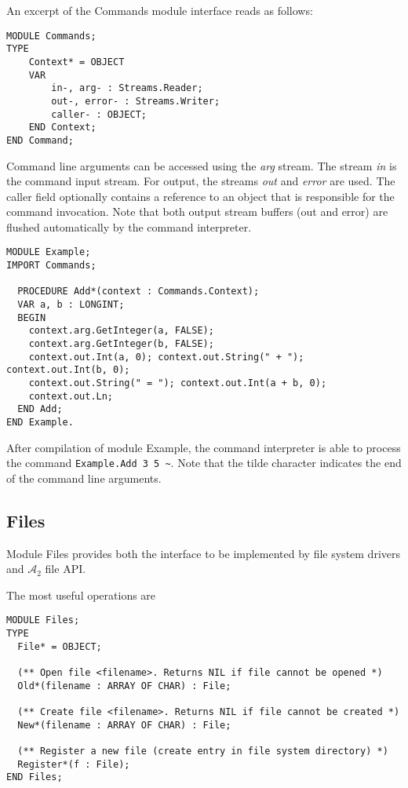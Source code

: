 \documentclass[a4paper,11pt]{article}
\newcommand{\AZ}{\ensuremath{\mathcal{A}_{2}}\xspace}
\begin{document}
An excerpt of the Commands module interface reads as follows:
\begin{lstlisting}[language=Oberon,frame=none,caption={Command Context}]
MODULE Commands;
TYPE
    Context* = OBJECT
    VAR
        in-, arg- : Streams.Reader;
        out-, error- : Streams.Writer;
        caller- : OBJECT;
    END Context;
END Command;
\end{lstlisting}

Command line arguments can be accessed using the \emph{arg} stream. The stream \emph{in} is the command input stream. For output, the streams \emph{out} and \emph{error} are used.
The caller field optionally contains a reference to an object that is responsible for the command invocation. Note that both output stream buffers (out and error) are flushed automatically by the command interpreter.

\begin{lstlisting}[language=Oberon,frame=none,caption={Command Example}]
MODULE Example;
IMPORT Commands;

  PROCEDURE Add*(context : Commands.Context);
  VAR a, b : LONGINT;
  BEGIN
    context.arg.GetInteger(a, FALSE);
    context.arg.GetInteger(b, FALSE);
    context.out.Int(a, 0); context.out.String(" + "); context.out.Int(b, 0);
    context.out.String(" = "); context.out.Int(a + b, 0);
    context.out.Ln;
  END Add;
END Example.
\end{lstlisting}

After compilation of module Example, the command interpreter is able to process the command
\verb+Example.Add 3 5 ~+.
Note that the tilde character indicates the end of the command line arguments.

\subsection{Files}
Module Files provides both the interface to be implemented by file system drivers and \AZ file API.

The most useful operations are
\begin{lstlisting}[language=Oberon,frame=none,caption={Basic Files API}]
MODULE Files;
TYPE
  File* = OBJECT;

  (** Open file <filename>. Returns NIL if file cannot be opened *)
  Old*(filename : ARRAY OF CHAR) : File;

  (** Create file <filename>. Returns NIL if file cannot be created *)
  New*(filename : ARRAY OF CHAR) : File;

  (** Register a new file (create entry in file system directory) *)
  Register*(f : File);
END Files;
\end{lstlisting}
\end{document}
